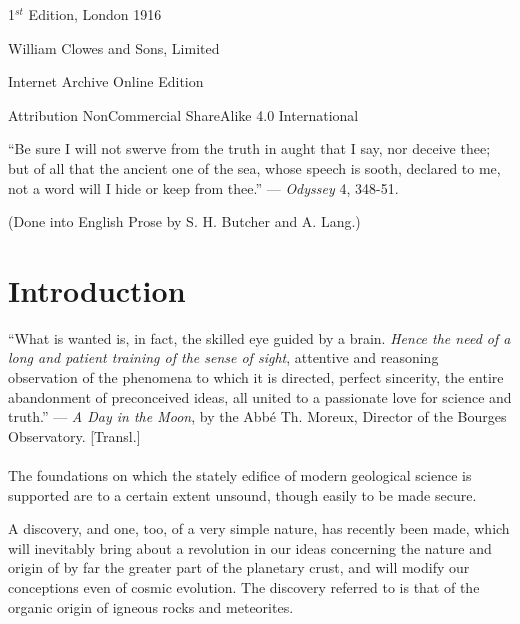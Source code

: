 \documentclass[a4paper, 12pt, oneside]{article}
\begin{document}
\begin{titlepage}
		
	\vspace*{\fill}%
	
	1$^{st}$ Edition, London 1916 %
	
	{\small William Clowes and Sons, Limited } %

	\vspace{1\baselineskip} %

    Internet Archive Online Edition  %
	
	{\small Attribution NonCommercial ShareAlike 4.0 International } %
\end{titlepage}
\setlength{\parskip}{1mm plus1mm minus1mm}
\setcounter{tocdepth}{3}
\setcounter{secnumdepth}{3}
\tableofcontents
\clearpage
\listoffigures{}
\clearpage
\begin{displayquote}
``Be sure I will not swerve from the truth in aught that I say, nor deceive thee; but of all that the ancient one of the sea, whose speech is sooth, declared to me, not a word will I hide or keep from thee.'' --- \emph{Odyssey} 4, 348-51.

(Done into English Prose by S. H. Butcher and A. Lang.)
\end{displayquote}
\clearpage
\section*{Introduction}
\begin{displayquote}
``What is wanted is, in fact, the skilled eye guided by a brain. \emph{Hence the need of a long and patient training of the sense of sight}, attentive and reasoning observation of the phenomena to which it is directed, perfect sincerity, the entire abandonment of preconceived ideas, all united to a passionate love for science and truth.'' --- \emph{A Day in the Moon}, by the Abbé Th. Moreux, Director of the Bourges Observatory. [Transl.]
\end{displayquote}
\paragraph{}
The foundations on which the stately edifice of modern geological science is supported are to a certain extent unsound, though easily to be made secure.

A discovery, and one, too, of a very simple nature, has recently been made, which will inevitably bring about a revolution in our ideas concerning the nature and origin of by far the greater part of the planetary crust, and will modify our conceptions even of cosmic evolution. The discovery referred to is that of the organic origin of igneous rocks and meteorites.
\end{document}
